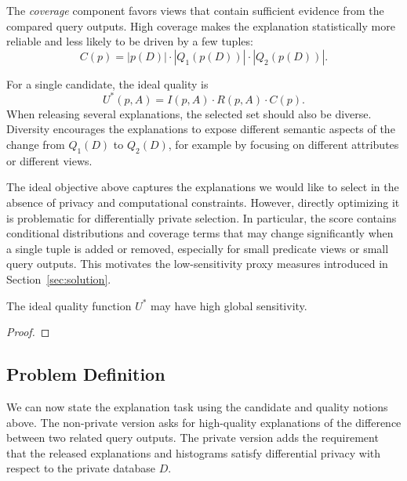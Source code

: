 The \emph{coverage} component favors views that contain sufficient evidence from the compared query outputs.
High coverage makes the explanation statistically more reliable and less likely to be driven by a few tuples:
\[
C(p)
=
|p(D)| \cdot |Q_1(p(D))| \cdot |Q_2(p(D))|.
\]

For a single candidate, the ideal quality is
\[
U^*(p,A)
=
I(p,A) \cdot R(p,A) \cdot C(p).
\]
When releasing several explanations, the selected set should also be diverse.
Diversity encourages the explanations to expose different semantic aspects of the change from $Q_1(D)$ to $Q_2(D)$, for example by focusing on different attributes or different views.

The ideal objective above captures the explanations we would like to select in the absence of privacy and computational constraints.
However, directly optimizing it is problematic for differentially private selection.
In particular, the score contains conditional distributions and coverage terms that may change significantly when a single tuple is added or removed, especially for small predicate views or small query outputs.
This motivates the low-sensitivity proxy measures introduced in Section~\ref{sec:solution}.

\begin{proposition}
\label{prop:ideal-utility-sensitivity}
The ideal quality function $U^*$ may have high global sensitivity.
\end{proposition}

\begin{proof}
\end{proof}

\subsection{Problem Definition}
\label{subsec:problem-definition}

We can now state the explanation task using the candidate and quality notions above.
The non-private version asks for high-quality explanations of the difference between two related query outputs.
The private version adds the requirement that the released explanations and histograms satisfy differential privacy with respect to the private database $D$.


